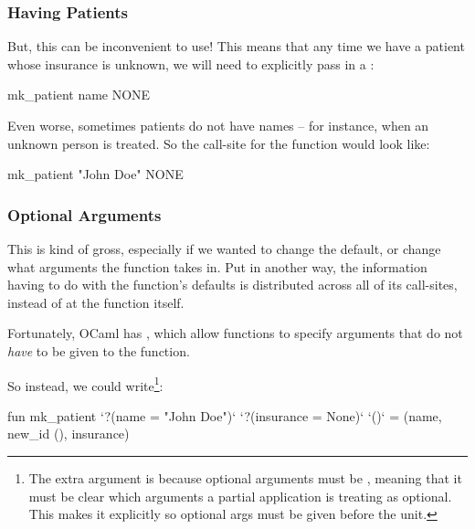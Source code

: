 \documentclass[aspectratio=169, handout]{beamer}
\begin{document}
\begin{frame}[fragile]
  \frametitle{Having Patients}

  But, this can be inconvenient to use! This means that any time we have a
  patient whose insurance is unknown, we will need to explicitly pass in a
  :

  \vspace{\fill}

  \begin{codeblock}
    mk_patient name NONE
  \end{codeblock}

  \vspace{\fill}

  Even worse, sometimes patients do not have names -- for instance, when
  an unknown person is treated. So the call-site for the function would
  look like:

  \vspace{\fill}

  \begin{codeblock}
    mk_patient "John Doe" NONE
  \end{codeblock}
\end{frame}

\begin{frame}[fragile]
  \frametitle{Optional Arguments}

  This is kind of gross, especially if we wanted to change the default, or
  change what arguments the function takes in. Put in another way, the information
  having to do with the function's defaults is distributed across all of its call-sites,
  instead of at the function itself.

  \vspace{\fill}

  Fortunately, OCaml has , which allow functions to specify
  arguments that do not \textit{have} to be given to the function.

  \vspace{\fill}

  So instead, we could write\footnote{The extra \code{()} argument is because
  optional arguments must be , meaning that it must be clear
  which arguments a partial application is treating as optional. This makes
  it explicitly so optional args must be given before the unit.}:
  \begin{codeblock}
    fun mk_patient `?(name = "John Doe")` `?(insurance = None)` `()` =
      (name, new_id (), insurance)
  \end{codeblock}
\end{frame}
\end{document}
